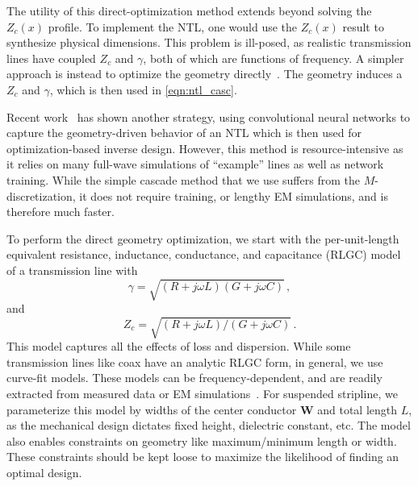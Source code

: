 The utility of this direct-optimization method extends beyond solving the $Z_c(x)$ profile.
To implement the NTL, one would use the $Z_c(x)$ result to synthesize physical dimensions.
This problem is ill-posed, as realistic transmission lines have coupled $Z_c$ and $\gamma$, both of which are functions of frequency.
A simpler approach is instead to optimize the geometry directly~\cite{miazgaDiscreteShapeOptimization2008, schaepperleOptimizationDistributedParameter1994}.
The geometry induces a $Z_c$ and $\gamma$, which is then used in \eqref{eqn:ntl_casc}.

Recent work~\cite{tremuelParameterfreeNeuralFieldbased2023} has shown another strategy, using convolutional neural networks to capture the geometry-driven behavior of an NTL which is then used for optimization-based inverse design.
However, this method is resource-intensive as it relies on many full-wave simulations of ``example'' lines as well as network training.
While the simple cascade method that we use suffers from the $M$-discretization, it does not require training, or lengthy EM simulations, and is therefore much faster.

To perform the direct geometry optimization, we start with the per-unit-length equivalent resistance, inductance, conductance, and capacitance (RLGC) model of a transmission line with
%
\begin{equation}
	\gamma = \sqrt{\left(R + j \omega L\right) \left( G + j \omega C\right)} \,,
\end{equation}
and
\begin{equation}
	Z_{c} = \sqrt{\left(R + j \omega L\right) / \left( G + j \omega C\right)} \,.
\end{equation}
%
This model captures all the effects of loss and dispersion.
While some transmission lines like coax have an analytic RLGC form, in general, we use curve-fit models.
These models can be frequency-dependent, and are readily extracted from measured data or EM simulations~\cite{zhangCausalRLGCModels2010}.
For suspended stripline, we parameterize this model by widths of the center conductor $\mathbf{W}$ and total length $L$, as the mechanical design dictates fixed height, dielectric constant, etc.
The model also enables constraints on geometry like maximum/minimum length or width.
These constraints should be kept loose to maximize the likelihood of finding an optimal design.

